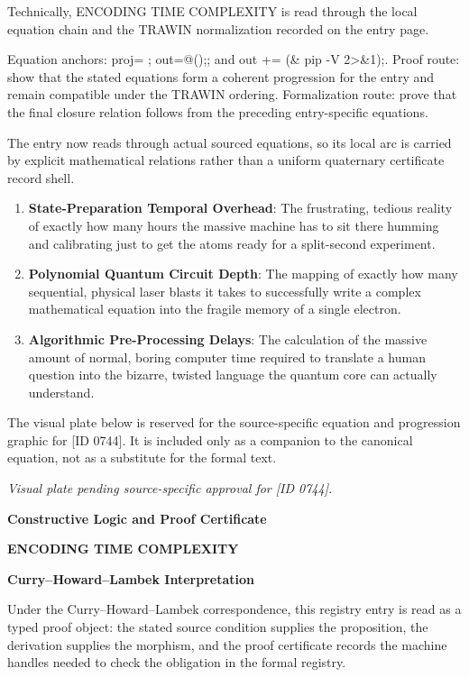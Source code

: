 Technically, ENCODING TIME COMPLEXITY is read through the local equation chain and the TRAWIN normalization recorded on the entry page.

Equation anchors: proj= ; out=@();; and out += (\& pip -V 2>\&1);. Proof route: show that the stated equations form a coherent progression for the entry and remain compatible under the TRAWIN ordering. Formalization route: prove that the final closure relation follows from the preceding entry-specific equations.

The entry now reads through actual sourced equations, so its local arc is carried by explicit mathematical relations rather than a uniform quaternary certificate record shell.
\endgroup

\begin{enumerate}[leftmargin=1.6em,itemsep=6pt,topsep=4pt]
\item \textbf{State-Preparation Temporal Overhead}: The frustrating, tedious reality of exactly how many hours the massive machine has to sit there humming and calibrating just to get the atoms ready for a split-second experiment.
\item \textbf{Polynomial Quantum Circuit Depth}: The mapping of exactly how many sequential, physical laser blasts it takes to successfully write a complex mathematical equation into the fragile memory of a single electron.
\item \textbf{Algorithmic Pre-Processing Delays}: The calculation of the massive amount of normal, boring computer time required to translate a human question into the bizarre, twisted language the quantum core can actually understand.
\end{enumerate}

\begingroup\footnotesize\sloppy
The visual plate below is reserved for the source-specific equation and progression graphic for [ID 0744]. It is included only as a companion to the canonical equation, not as a substitute for the formal text.
\par\endgroup
\begingroup\footnotesize\itshape
Visual plate pending source-specific approval for [ID 0744].
\par\endgroup

\clearpage
\begingroup\tzpsupportsetup
\noindent\textbf{\fontsize{10.8pt}{12.8pt}\selectfont [ID 0744] Constructive Logic and Proof Certificate}\par
\noindent\textbf{\fontsize{10pt}{12pt}\selectfont ENCODING TIME COMPLEXITY}\par
\vspace{0.45em}
\begingroup
\footnotesize
\setlength{\parskip}{0.22em}
\setlength{\parindent}{0pt}
\noindent\textbf{Curry--Howard--Lambek Interpretation}\par
Under the Curry--Howard--Lambek correspondence, this registry entry is read as a typed proof
object: the stated source condition supplies the proposition, the derivation supplies the
morphism, and the proof certificate records the machine handles needed to check the obligation
in the formal registry.

